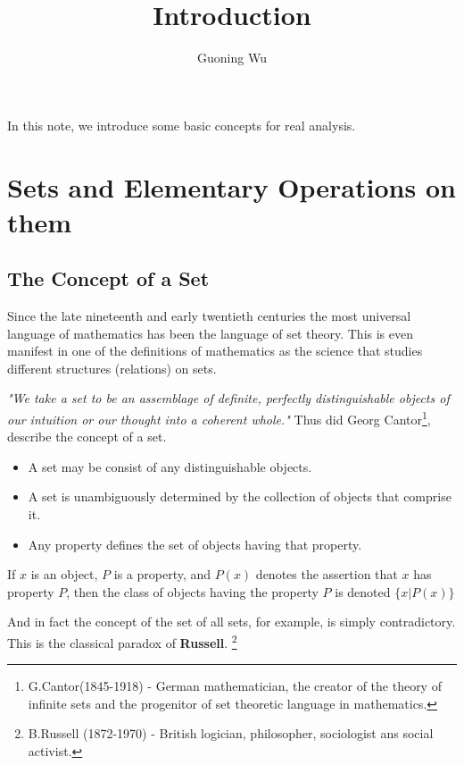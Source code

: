 \documentclass[a4paper,12pt]{article} %
\title{Introduction}
\author{Guoning Wu}
\begin{document}
\graphicspath{{../Figs/}}

\setcounter{tocdepth}{2}


\maketitle

In this note, we introduce some basic concepts for real 
analysis.

\section{Sets and Elementary Operations on them}
\subsection{The Concept of a Set}
Since the late nineteenth and early twentieth centuries 
the most universal language of mathematics has been the 
language of set theory. This is even manifest in one of 
the definitions of mathematics as the science that 
studies different structures (relations) on sets.

\emph{"We take a set to be an assemblage of definite, 
perfectly distinguishable objects of our intuition or 
our thought into a coherent whole."} Thus did Georg 
Cantor\footnote{G.Cantor(1845-1918) - German 
mathematician, the creator of the theory of infinite 
sets and the progenitor of set theoretic language in 
mathematics.}, describe the concept of a set.

\begin{itemize}
    \item A set may be consist of any distinguishable 
        objects.
    \item A set is unambiguously determined by the 
        collection of objects that comprise it.
    \item Any property defines the set of objects 
        having that property.
\end{itemize}

If $x$ is an object, $P$ is a property, and $P(x)$ 
denotes the assertion that $x$ has property $P$, 
then the class of objects having the property
$P$ is denoted $\{x\lvert P(x)\}$

And in fact the concept of the set of all sets, for 
example, is simply contradictory. This is the 
classical paradox of \textbf{Russell}. \footnote{B.Russell (1872-1970) - British logician,
philosopher, sociologist ans social activist.}
\end{document}
